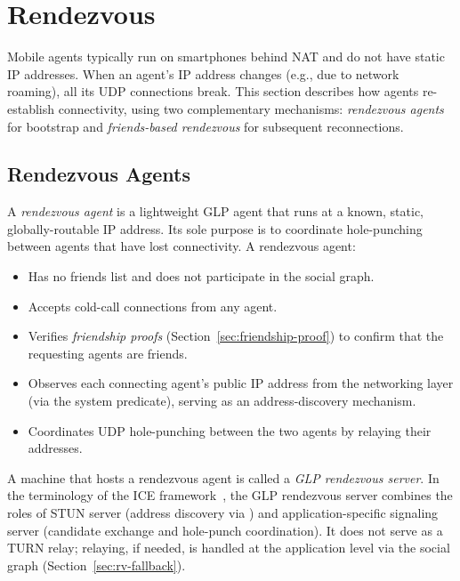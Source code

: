 \section{Rendezvous}
\label{sec:rendezvous}
Mobile agents typically run on smartphones behind NAT and do not have static IP addresses.  When an agent's IP address changes (e.g., due to network roaming), all its UDP connections break.  This section describes how agents re-establish connectivity, using two complementary mechanisms: \emph{rendezvous agents} for bootstrap and \emph{friends-based rendezvous} for subsequent reconnections.

\subsection{Rendezvous Agents}
\label{sec:rv-agents}
A \emph{rendezvous agent} is a lightweight GLP agent that runs at a known, static, globally-routable IP address.  Its sole purpose is to coordinate hole-punching between agents that have lost connectivity.  A rendezvous agent:
\begin{itemize}
\item Has no friends list and does not participate in the social graph.
\item Accepts cold-call connections from any agent.
\item Verifies \emph{friendship proofs} (Section~\ref{sec:friendship-proof}) to confirm that the requesting agents are friends.
\item Observes each connecting agent's public IP address from the networking layer (via the  system predicate), serving as an address-discovery mechanism.
\item Coordinates UDP hole-punching between the two agents by relaying their addresses.
\end{itemize}

A machine that hosts a rendezvous agent is called a \emph{GLP rendezvous server}.  In the terminology of the ICE framework~\cite{rfc8445}, the GLP rendezvous server combines the roles of STUN server (address discovery via ) and application-specific signaling server (candidate exchange and hole-punch coordination).  It does not serve as a TURN relay; relaying, if needed, is handled at the application level via the social graph (Section~\ref{sec:rv-fallback}).


